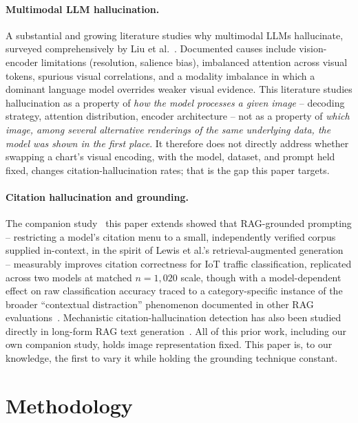\documentclass[twocolumn]{svjour3}
\begin{document}
\paragraph{Multimodal LLM hallucination.} A substantial and growing literature studies why
multimodal LLMs hallucinate, surveyed comprehensively by Liu et al.~\cite{mllmhallucsurvey2024}.
Documented causes include vision-encoder limitations (resolution, salience bias), imbalanced
attention across visual tokens, spurious visual correlations, and a modality imbalance in which a
dominant language model overrides weaker visual evidence. This literature studies hallucination as
a property of \emph{how the model processes a given image} -- decoding strategy, attention
distribution, encoder architecture -- not as a property of \emph{which image, among several
alternative renderings of the same underlying data, the model was shown in the first place}. It
therefore does not directly address whether swapping a chart's visual encoding, with the model,
dataset, and prompt held fixed, changes citation-hallucination rates; that is the gap this paper
targets.

\paragraph{Citation hallucination and grounding.} The companion study~\cite{groundingcitation2026}
this paper extends showed that RAG-grounded prompting -- restricting a model's citation menu to a
small, independently verified corpus supplied in-context, in the spirit of
Lewis et al.'s retrieval-augmented generation~\cite{lewis2020retrieval} -- measurably improves
citation correctness for IoT traffic classification, replicated across two models at matched
$n=1{,}020$ scale, though with a model-dependent effect on raw classification accuracy traced to a
category-specific instance of the broader ``contextual distraction'' phenomenon documented in other
RAG evaluations~\cite{adaptivedistraction2025}. Mechanistic citation-hallucination detection has
also been studied directly in long-form RAG text generation~\cite{factum2026}. All of this prior
work, including our own companion study, holds image representation fixed. This paper is, to our
knowledge, the first to vary it while holding the grounding technique constant.

\section{Methodology}
\label{sec:methods}
\end{document}
